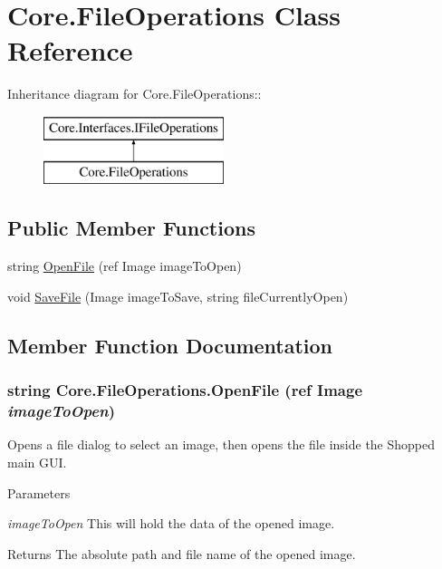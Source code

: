 \hypertarget{class_core_1_1_file_operations}{
\section{Core.FileOperations Class Reference}
\label{class_core_1_1_file_operations}
}
Inheritance diagram for Core.FileOperations::\begin{figure}[H]
\begin{center}
\leavevmode
\includegraphics[height=2cm]{class_core_1_1_file_operations}
\end{center}
\end{figure}
\subsection*{Public Member Functions}
\begin{DoxyCompactItemize}
\item 
string \hyperlink{class_core_1_1_file_operations_a1f424475b7f385f349d9921186ed4beb}{OpenFile} (ref Image imageToOpen)
\item 
void \hyperlink{class_core_1_1_file_operations_a93ad3dfb3b18dc15b2986ae831cc6eed}{SaveFile} (Image imageToSave, string fileCurrentlyOpen)
\end{DoxyCompactItemize}


\subsection{Member Function Documentation}
\hypertarget{class_core_1_1_file_operations_a1f424475b7f385f349d9921186ed4beb}{
\subsubsection[{OpenFile}]{\setlength{\rightskip}{0pt plus 5cm}string Core.FileOperations.OpenFile (ref Image {\em imageToOpen})}}
\label{class_core_1_1_file_operations_a1f424475b7f385f349d9921186ed4beb}
Opens a file dialog to select an image, then opens the file inside the Shopped main GUI.


\begin{DoxyParams}{Parameters}
\item[{\em imageToOpen}]This will hold the data of the opened image. \end{DoxyParams}
\begin{DoxyReturn}{Returns}
The absolute path and file name of the opened image. 
\end{DoxyReturn}


